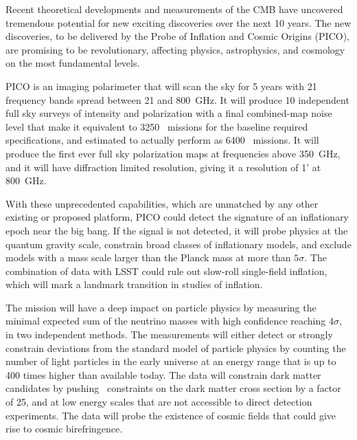\documentclass[PICOReport.tex]{subfiles}
\begin{document}
Recent theoretical developments and measurements of the \ac{CMB} have uncovered tremendous potential for new exciting discoveries over the next 10 years. The new discoveries, to be delivered by the Probe of Inflation and Cosmic Origins (PICO), are promising to be revolutionary, affecting physics, astrophysics, and cosmology on the most fundamental levels. 

PICO is an imaging polarimeter that will scan the sky for 5 years with 21 frequency bands spread between 21 and 800~GHz. It will produce 10 independent full sky surveys of intensity and polarization with a final combined-map noise level that make it equivalent to 3250 \planck\ missions for the baseline required specifications, and estimated to actually perform as 6400 \planck\ missions. It will produce the first ever full sky polarization maps at frequencies above 350~GHz, and it will have diffraction limited resolution, giving it a resolution of 1' at 800~GHz. 

With these unprecedented capabilities, which are unmatched by any other existing or proposed platform, PICO could detect the signature of an inflationary epoch near the big bang. If the signal is not detected, it will probe physics at the quantum gravity scale, constrain broad classes of inflationary models, and exclude models with a mass scale larger than the Planck mass at more than $5\sigma$. The combination of data with LSST could rule out slow-roll single-field inflation, which will mark a landmark transition in studies of inflation. 

The mission will have a deep impact on particle physics by measuring the minimal expected sum of the neutrino masses with high confidence reaching $4\sigma$, in two independent methods. The measurements will either detect or strongly constrain deviations from the standard model of particle physics by counting the number of light particles in the early universe at an energy range that is up to 400 times higher than available today. The data will constrain dark matter candidates by pushing \planck\ constraints on the dark matter cross section by a factor of 25, and at low energy scales that are not accessible to direct detection experiments. The data will probe the existence of cosmic fields that could give rise to cosmic birefringence. 
\end{document}
